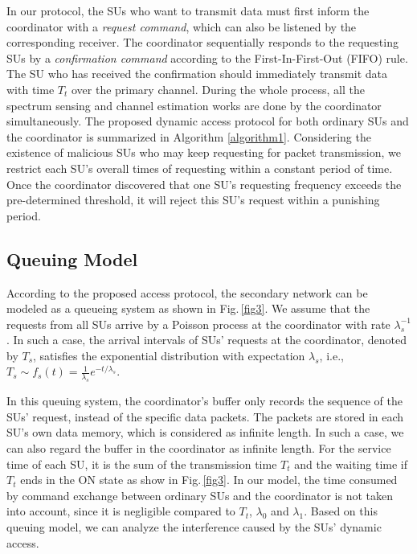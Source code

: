 \documentclass[11pt,draftcls]{IEEEtran}{\onecolumn}
\begin{document}
In our protocol, the SUs who want to transmit data must first inform
the coordinator with a \emph{request command}, which can also be
listened by the corresponding receiver. The coordinator sequentially
responds to the requesting SUs by a \emph{confirmation command}
according to the First-In-First-Out (FIFO) rule. The SU who has
received the confirmation should immediately transmit data with time
$T_t$ over the primary channel. During the whole process, all the
spectrum sensing and channel estimation works are done by the
coordinator simultaneously. The proposed dynamic access protocol for
both ordinary SUs and the coordinator is summarized in Algorithm
\ref{algorithm1}. Considering the existence of malicious SUs who may
keep requesting for packet transmission, we restrict each SU's
overall times of requesting within a constant period of time. Once
the coordinator discovered that one SU's requesting frequency
exceeds the pre-determined threshold, it will reject this SU's
request within a punishing period.

\subsection{Queuing Model}\label{queuing}

According to the proposed access protocol, the secondary network can
be modeled as a queueing system as shown in Fig.\,\ref{fig3}.
We assume that the requests from all SUs arrive by a Poisson process at the
coordinator with rate $\lambda_{s}^{-1}$.
In such a case, the arrival intervals of SUs' requests at the
coordinator, denoted by $T_s$, satisfies the exponential
distribution with expectation $\lambda_s$, i.e., $T_s\sim f_{s}(t)=
\frac{1}{\lambda_s}e^{-t/\lambda_s}$.

In this queuing system, the coordinator's buffer only records the
sequence of the SUs' request, instead of the specific data packets.
The packets are stored in each SU's own data memory, which is
considered as infinite length. In such a case, we can also regard
the buffer in the coordinator as infinite length. For the service
time of each SU, it is the sum of the transmission time $T_t$ and
the waiting time if $T_t$ ends in the ON state as show in
Fig.\,\ref{fig3}. In our model, the time consumed by command
exchange between ordinary SUs and the coordinator is not taken into
account, since it is negligible compared to $T_t$, $\lambda_0$ and
$\lambda_1$. Based on this queuing model, we can analyze the
interference caused by the SUs' dynamic access.
\end{document}
